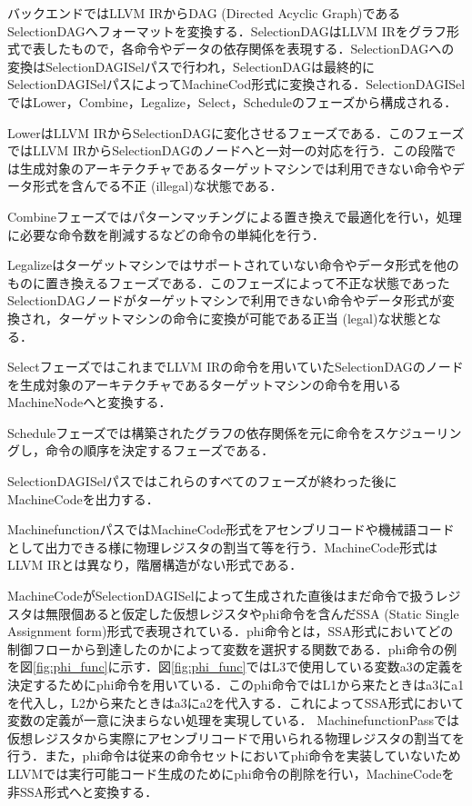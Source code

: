バックエンドではLLVM IRからDAG (Directed Acyclic Graph)であるSelectionDAGへフォーマットを変換する．SelectionDAGはLLVM IRをグラフ形式で表したもので，各命令やデータの依存関係を表現する．SelectionDAGへの変換はSelectionDAGISelパスで行われ，SelectionDAGは最終的にSelectionDAGISelパスによってMachineCod形式に変換される．SelectionDAGISelではLower，Combine，Legalize，Select，Scheduleのフェーズから構成される．

LowerはLLVM IRからSelectionDAGに変化させるフェーズである．このフェーズではLLVM IRからSelectionDAGのノードへと一対一の対応を行う．この段階では生成対象のアーキテクチャであるターゲットマシンでは利用できない命令やデータ形式を含んでる不正 (illegal)な状態である．

Combineフェーズではパターンマッチングによる置き換えで最適化を行い，処理に必要な命令数を削減するなどの命令の単純化を行う．

Legalizeはターゲットマシンではサポートされていない命令やデータ形式を他のものに置き換えるフェーズである．このフェーズによって不正な状態であったSelectionDAGノードがターゲットマシンで利用できない命令やデータ形式が変換され，ターゲットマシンの命令に変換が可能である正当 (legal)な状態となる．

SelectフェーズではこれまでLLVM IRの命令を用いていたSelectionDAGのノードを生成対象のアーキテクチャであるターゲットマシンの命令を用いるMachineNodeへと変換する．

Scheduleフェーズでは構築されたグラフの依存関係を元に命令をスケジューリングし，命令の順序を決定するフェーズである．

SelectionDAGISelパスではこれらのすべてのフェーズが終わった後にMachineCodeを出力する．

MachinefunctionパスではMachineCode形式をアセンブリコードや機械語コードとして出力できる様に物理レジスタの割当て等を行う．MachineCode形式はLLVM IRとは異なり，階層構造がない形式である．

MachineCodeがSelectionDAGISelによって生成された直後はまだ命令で扱うレジスタは無限個あると仮定した仮想レジスタやphi命令を含んだSSA (Static Single Assignment form)形式で表現されている．phi命令とは，SSA形式においてどの制御フローから到達したのかによって変数を選択する関数である．phi命令の例を図\ref{fig:phi_func}に示す．図\ref{fig:phi_func}ではL3で使用している変数a3の定義を決定するためにphi命令を用いている．このphi命令ではL1から来たときはa3にa1を代入し，L2から来たときはa3にa2を代入する．これによってSSA形式において変数の定義が一意に決まらない処理を実現している．
MachinefunctionPassでは仮想レジスタから実際にアセンブリコードで用いられる物理レジスタの割当てを行う．また，phi命令は従来の命令セットにおいてphi命令を実装していないためLLVMでは実行可能コード生成のためにphi命令の削除を行い，MachineCodeを非SSA形式へと変換する．

